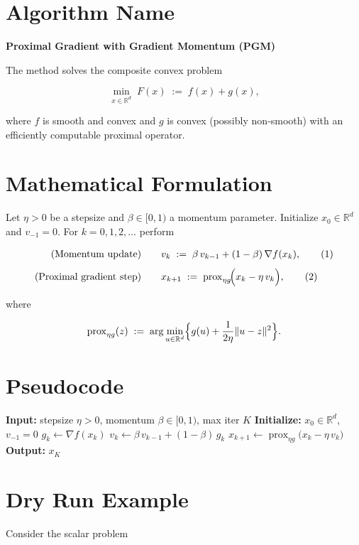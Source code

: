 \documentclass{article}
\newcommand{\prox}{\operatorname{prox}}
\begin{document}
\section*{Algorithm Name}
\textbf{Proximal Gradient with Gradient Momentum (PGM)}  

The method solves the composite convex problem  

\[
\min_{x\in\mathbb{R}^d}\;F(x)\;:=\;f(x)+g(x),
\]

where $f$ is smooth and convex and $g$ is convex (possibly non‑smooth) with an efficiently computable proximal operator.

\section*{Mathematical Formulation}
Let $\eta>0$ be a stepsize and $\beta\in[0,1)$ a momentum parameter.  
Initialize $x_{0}\in\mathbb{R}^{d}$ and $v_{-1}=0$. For $k=0,1,2,\dots$ perform  

\[
\begin{aligned}
\text{(Momentum update)}\qquad 
&v_{k}\;:=\;\beta\,v_{k-1}+(1-\beta)\,\nabla f(x_{k}), \tag{1}\\[4pt]
\text{(Proximal gradient step)}\qquad 
&x_{k+1}\;:=\;\prox_{\eta g}\!\Bigl(x_{k}-\eta\,v_{k}\Bigr), \tag{2}
\end{aligned}
\]

where  

\[
\prox_{\eta g}(z)\;:=\;\arg\min_{u\in\mathbb{R}^{d}}\Bigl\{g(u)+\frac{1}{2\eta}\|u-z\|^{2}\Bigr\}.
\]

\section*{Pseudocode}
\begin{algorithm}[H]
\caption{Proximal Gradient with Gradient Momentum (PGM)}
\begin{algorithmic}[1]
\State \textbf{Input:} stepsize $\eta>0$, momentum $\beta\in[0,1)$, max iter $K$
\State \textbf{Initialize:} $x_{0}\in\mathbb{R}^{d}$, $v_{-1}=0$
    \State $g_{k}\gets \nabla f(x_{k})$ 
    \State $v_{k}\gets \beta\,v_{k-1}+(1-\beta)\,g_{k}$ 
    \State $x_{k+1}\gets \prox_{\eta g}\bigl(x_{k}-\eta\,v_{k}\bigr)$
\EndFor
\State \textbf{Output:} $x_{K}$
\end{algorithmic}
\end{algorithm}

\section*{Dry Run Example}
Consider the scalar problem  
\end{document}
